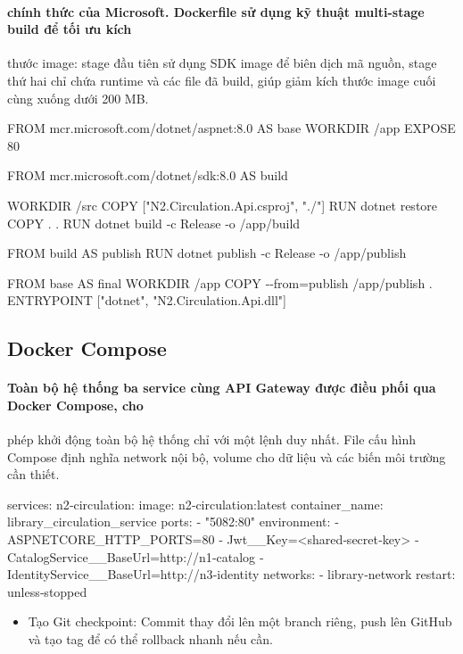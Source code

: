 \paragraph{chính thức của Microsoft. Dockerfile sử dụng kỹ thuật multi-stage build để tối ưu kích}

thước image: stage đầu tiên sử dụng SDK image để biên dịch mã nguồn, stage thứ hai chỉ chứa runtime và các file đã build, giúp giảm kích thước image cuối cùng xuống dưới 200 MB.

FROM mcr.microsoft.com/dotnet/aspnet:8.0 AS base WORKDIR /app EXPOSE 80

FROM mcr.microsoft.com/dotnet/sdk:8.0 AS build

WORKDIR /src COPY ["N2.Circulation.Api.csproj", "./"] RUN dotnet restore COPY . . RUN dotnet build ‐c Release ‐o /app/build

FROM build AS publish RUN dotnet publish ‐c Release ‐o /app/publish

FROM base AS final WORKDIR /app COPY ‐‐from=publish /app/publish . ENTRYPOINT ["dotnet", "N2.Circulation.Api.dll"]

\subsection{Docker Compose}

\paragraph{Toàn bộ hệ thống ba service cùng API Gateway được điều phối qua Docker Compose, cho}

phép khởi động toàn bộ hệ thống chỉ với một lệnh duy nhất. File cấu hình Compose định nghĩa network nội bộ, volume cho dữ liệu và các biến môi trường cần thiết.

services: n2‐circulation: image: n2‐circulation:latest container\_name: library\_circulation\_service ports: ‐ "5082:80" environment: ‐ ASPNETCORE\_HTTP\_PORTS=80 ‐ Jwt\_\_Key=<shared‐secret‐key> ‐ CatalogService\_\_BaseUrl=http://n1‐catalog ‐ IdentityService\_\_BaseUrl=http://n3‐identity networks: ‐ library‐network restart: unless‐stopped

\begin{itemize}
  \item Tạo Git checkpoint: Commit thay đổi lên một branch riêng, push lên GitHub và
tạo tag để có thể rollback nhanh nếu cần.

\end{itemize}

